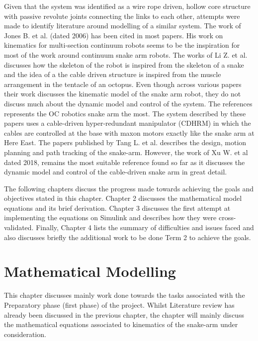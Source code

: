 \documentclass[a4paper,12pt]{report}
\begin{document}
Given that the system was identified as a wire rope driven, hollow core structure with passive revolute joints connecting the links to each other, attempts were made to identify literature around modelling of a similar system. The work of Jones B. et al. \cite{RN2} (dated 2006) has been cited in most papers. His work on kinematics for multi-section continuum robots seems to be the inspiration for most of the work around continuum snake arm robots. The works of Li Z. et al. \cite{RN8,RN7,RN15,RN21} discusses how the skeleton of the robot is inspired from the skeleton of a snake and the idea of a the cable driven structure is inspired from the muscle arrangement in the tentacle of an octopus. Even though across various papers their work discusses the kinematic model of the snake arm robot, they do not discuss much about the dynamic model and control of the system. The references \cite{RN35,RN31,RN29,RN30} represents the OC robotics snake arm the most. The system described by these papers uses a cable-driven hyper-redundant manipulator (CDHRM) in which the cables are controlled at the base with maxon motors exactly like the snake arm at Here East. The papers published by Tang L. et al. \cite{RN35,RN31} describes the design, motion planning and path tracking of the snake-arm.  However, the work of Xu W. et al \cite{RN30} dated 2018, remains the most suitable reference found so far as it discusses the dynamic model and control of the cable-driven snake arm in great detail. 

\vspace{20mm}

The following chapters discuss the progress made towards achieving the goals and objectives stated in this chapter. Chapter 2 discusses the mathematical model equations and its brief derivation. Chapter 3 discusses the first attempt at implementing the equations on Simulink and describes how they were cross-validated. Finally, Chapter 4 lists the summary of difficulties and issues faced and also discusses briefly the additional work to be done Term 2 to achieve the goals.



\chapter{Mathematical Modelling}
This chapter discusses mainly work done towards the tasks associated with the Preparatory phase (first phase) of the project. Whilst Literature review has already been discussed in the previous chapter, the chapter will mainly discuss the mathematical equations associated to kinematics of the snake-arm under consideration.
\end{document}
